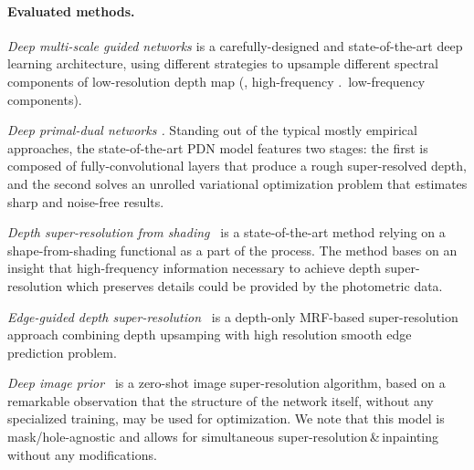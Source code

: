 
\paragraph{Evaluated methods.} 
\noindent\emph{Deep multi-scale guided networks \cite{hui2016depth}} is 
a carefully-designed and state-of-the-art deep learning architecture, using different strategies to upsample different spectral
components of low-resolution depth map (\eg, high-frequency \vs.\ low-frequency components). 

\noindent\emph{Deep primal-dual networks \cite{riegler2016deep}.}
Standing out of the typical mostly empirical approaches, the state-of-the-art PDN model features two stages: the first is composed of fully-convolutional layers that produce a rough super-resolved depth, and the second solves an unrolled variational optimization problem that estimates sharp and noise-free results.

\noindent\emph{Depth super-resolution from shading~\cite{haefner2018fight}} is a state-of-the-art method relying on a shape-from-shading functional as a part of the process.  The method bases on an insight that high-frequency information necessary to achieve depth super-resolution which preserves details could be provided by the photometric data. 

\noindent\emph{Edge-guided depth super-resolution~\cite{xie2016edge}} is a depth-only MRF-based super-resolution approach combining depth upsamping with high resolution smooth edge prediction problem. 

\noindent\emph{Deep image prior~\cite{Ulyanov_2018_CVPR}} is a zero-shot image super-resolution algorithm, based on a remarkable observation that the structure of the network itself, without any specialized training, may be used for optimization. We note that this model is mask/hole-agnostic and allows for simultaneous super-resolution\,\&\,inpainting without any modifications.

